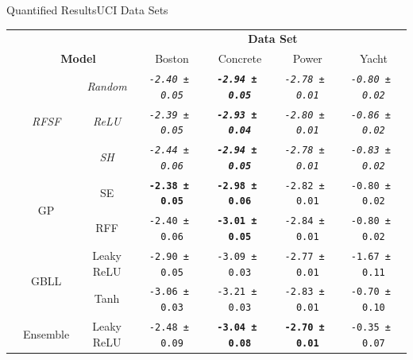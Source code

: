 \documentclass[
	USenglish,
	aspectratio=43,
	color={accentcolor=1c},
	logo=true,
	colorframetitle=true,
	hyperref={pdfpagelabels=true},
]{tudabeamer}
\newcommand{\acs}[1]{#1}
\begin{document}
		\begin{frame}{Quantified Results}{UCI Data Sets}
			\begin{center}
				\tiny
				\begin{tabular}{c|cc|cccc}
					\toprule
					& & & \multicolumn{4}{c}{\textbf{Data Set}} \\[1pt]
					& \multicolumn{2}{c|}{\textbf{Model}}                               & Boston                           & Concrete                         & Power                            & Yacht                            \\
					\midrule \multirow{11}{*}{\rotatebox{90}{\textbf{Log-Lik.}}}
					& \multirow[t]{3}{*}{\textit{RFSF}}             & \textit{Random}           & \textit{\texttt{-2.40\,±\,0.05}}          & \textit{\textbf{\texttt{-2.94\,±\,0.05}}} & \textit{\texttt{-2.78\,±\,0.01}}          & \textit{\texttt{-0.80\,±\,0.02}}          \\
					&                                            & \textit{\acs{ReLU}}       & \textit{\texttt{-2.39\,±\,0.05}}          & \textit{\textbf{\texttt{-2.93\,±\,0.04}}} & \textit{\texttt{-2.80\,±\,0.01}}          & \textit{\texttt{-0.86\,±\,0.02}}          \\
					&                                            & \textit{\acs{SH}}         & \textit{\texttt{-2.44\,±\,0.06}}          & \textit{\textbf{\texttt{-2.94\,±\,0.05}}} & \textit{\texttt{-2.78\,±\,0.01}}          & \textit{\texttt{-0.83\,±\,0.02}}          \\
					& \multirow[t]{2}{*}{\acs{GP}}               & \acs{SE}         & \textbf{\texttt{-2.38\,±\,0.05}} & \textbf{\texttt{-2.98\,±\,0.06}} & \texttt{-2.82\,±\,0.01}          & \texttt{-0.80\,±\,0.02}          \\
					&                                            & \acs{RFF}        & \texttt{-2.40\,±\,0.06}          & \textbf{\texttt{-3.01\,±\,0.05}} & \texttt{-2.84\,±\,0.01}          & \texttt{-0.80\,±\,0.02}          \\
					& \multirow[t]{2}{*}{\acs{GBLL}}\footnotemark[1] & Leaky \acs{ReLU} & \texttt{-2.90\,±\,0.05}          & \texttt{-3.09\,±\,0.03}          & \texttt{-2.77\,±\,0.01}          & \texttt{-1.67\,±\,0.11}          \\
					&                                            & Tanh             & \texttt{-3.06\,±\,0.03}          & \texttt{-3.21\,±\,0.03}          & \texttt{-2.83\,±\,0.01}          & \texttt{-0.70\,±\,0.10}          \\
					& \multirow[t]{2}{*}{Ensemble}\footnotemark[1]   & Leaky \acs{ReLU} & \texttt{-2.48\,±\,0.09}          & \textbf{\texttt{-3.04\,±\,0.08}} & \textbf{\texttt{-2.70\,±\,0.01}} & \texttt{-0.35\,±\,0.07}          \\

\end{tabular}
\end{center}
\end{frame}
\end{document}

